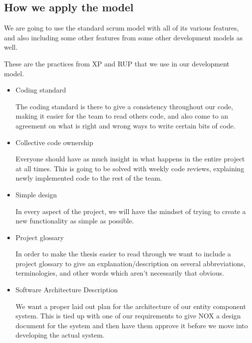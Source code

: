 \subsection{How we apply the model}

We are going to use the standard scrum model with all of its various features, and also including some other features from some other development models as well.


These are the practices from XP and RUP that we use in our development model. 
\begin{itemize}

    \item Coding standard


    The coding standard is there to give a consistency throughout our code, making it easier for the team to read others code, and also come to an agreement on what is right and wrong ways to write certain bits of code.


    \item Collective code ownership


    Everyone should have as much insight in what happens in the entire project at all times.
    This is going to be solved with weekly code reviews, explaining newly implemented code to the rest of the team.


    \item Simple design


    In every aspect of the project, we will have the mindset of trying to create a new functionality as simple as possible. 


    \item Project glossary


    In order to make the thesis easier to read through we want to include a project glossary to give an explanation/description on several abbreviations, terminologies, and other words which aren't necessarily that obvious.


    \item Software Architecture Description


     We want a proper laid out plan for the architecture of our entity component system. This is tied up with one of our requirements to give NOX a design document for the system and then have them approve it before we move into developing the actual system.

\end{itemize}

